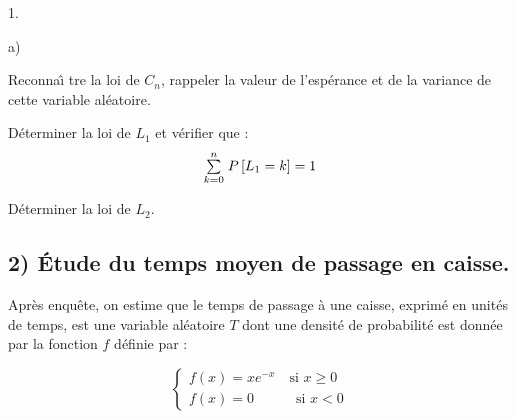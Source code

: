 \documentclass[11pt]{article}%
\begin{document}
\begin{noliste}{1.}
\begin{noliste}{a)}
 \setlength{\itemsep}{2mm}
\item Reconna\^{\i} tre la loi de $C_{n}$, rappeler la valeur de
l'espérance et de la variance de cette variable aléatoire.

\item Déterminer la loi de $L_{1}$ et vérifier que : 
\[
{\textstyle\sum\limits_{k = 0}^{n}}\hspace{.1cm} P\left[ L_{1} = k\right] = 1
\]

\item Déterminer la loi de $L_{2}$.
\end{noliste}
\end{noliste}

\subsection*{2) Étude du temps moyen de passage en caisse.}

Après enquête, on estime que le temps de passage à une caisse,
exprimé en unités de temps, est une variable aléatoire $T$ dont
une densité de probabilité est donnée par la fonction $f$ définie par :

\[
\left\{ \left. 
\begin{array}{l}
f(x) = xe^{-x}\quad \text{si }x\geq 0 \\
f(x) = 0\quad \quad \quad \text{si }x<0
\end{array}
\right. \right.
\]
\end{document}
